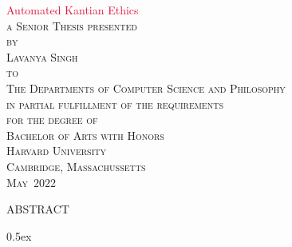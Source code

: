 \documentclass[11pt,a4paper]{article}
\begin{document}

\renewcommand{\maketitle}{
    \pagenumbering{roman}
    \setcounter{page}{1}
	\thispagestyle{empty}
	\vspace*{\fill}
	\vspace{100pt}
	\begin{center}
	\Huge \textcolor{crimson}{Automated Kantian Ethics} \normalsize \\
	\vspace{100pt}
	\textsc{a Senior Thesis presented \\ by\\
	Lavanya Singh\\ to\\ The Departments of Computer Science and Philosophy\\
	\vspace{12pt}
	in partial fulfillment of the requirements\\
	for the degree of\\ Bachelor of Arts with Honors \\
	\vspace{12pt}
	Harvard University\\ Cambridge, Massachussetts\\
	May\ 2022}
	\end{center} \vspace*{\fill}
}
\maketitle
{}

\newpage 

\begin{center}
\textsc{ABSTRACT} \\
\end{center}



\newpage

\tableofcontents

\parskip 0.5ex

\newpage
{}

\newpage 

\newpage

\newpage 

\newpage

\newpage
\appendix




\newpage

\end{document}
